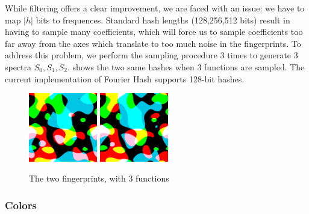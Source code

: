 \documentclass{article}
\begin{document}
While filtering offers a clear improvement, we are faced with an issue: we have to map $|h|$ bits to frequences. Standard hash lengths (128,256,512 bits) result in having to sample many coefficients, which will force us to sample coefficients too far away from the axes which translate to too much noise in the fingerprints. To address this problem, we perform the sampling procedure 3 times to generate 3 spectra $S_{0}, S_{1}, S_{2}$.   shows the two same hashes when 3 functions are sampled. The current implementation of Fourier Hash supports 128-bit hashes.

\begin{center}
\begin{figure}
    \centering
    \includegraphics[width=3cm]{figures/ThreeFuncs.png}
    \hspace{4pt}
    \includegraphics[width=3cm]{figures/ThreeFuncsP67Psi0232.png}
    \caption{The two fingerprints, with 3 functions}
    \label{fig:threeFuncs}
\end{figure}
\end{center}

\subsubsection{Colors}
\end{document}
